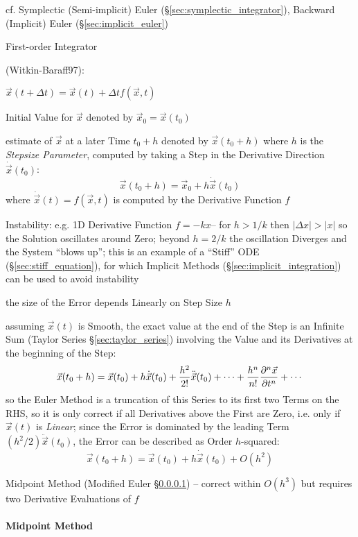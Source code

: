 \fist cf. Symplectic (Semi-implicit) Euler (\S\ref{sec:symplectic_integrator}),
Backward (Implicit) Euler (\S\ref{sec:implicit_euler})

First-order Integrator

(Witkin-Baraff97):

$\vec{x}(t + \Delta{t}) = \vec{x}(t) + \Delta{t}f(\vec{x},t)$

Initial Value for $\vec{x}$ denoted by $\vec{x}_0 = \vec{x}(t_0)$

estimate of $\vec{x}$ at a later Time $t_0 + h$ denoted by $\vec{x}(t_0 + h)$
where $h$ is the \emph{Stepsize Parameter}, computed by taking a Step in the
Derivative Direction $\dot{\vec{x}}(t_0)$:
\[
  \vec{x}(t_0 + h) = \vec{x}_0 + h\dot{\vec{x}}(t_0)
\]
where $\dot{\vec{x}}(t) = f(\vec{x}, t)$ is computed by the Derivative Function
$f$

Instability: e.g. 1D Derivative Function $f = -kx$-- for $h > 1/k$ then
$|\Delta{x}| > |x|$ so the Solution oscillates around Zero; beyond $h = 2/k$ the
oscillation Diverges and the System ``blows up''; this is an example of a
``Stiff'' ODE (\S\ref{sec:stiff_equation}), for which Implicit Methods
(\S\ref{sec:implicit_integration}) can be used to avoid instability

the size of the Error depends Linearly on Step Size $h$

assuming $\vec{x}(t)$ is Smooth, the exact value at the end of the Step is an
Infinite Sum (Taylor Series \S\ref{sec:taylor_series}) involving the Value and
its Derivatives at the beginning of the Step:
\[
  \vec{x}(t_0 + h) = \vec{x}(t_0) + h\dot{\vec{x}}(t_0) +
    \frac{h^2}{2!}\ddot{\vec{x}}(t_0) + \cdots +
    \frac{h^n}{n!}\frac{\partial{^n\vec{x}}}{\partial{t^n}} + \cdots
\]
so the Euler Method is a truncation of this Series to its first two Terms on the
RHS, so it is only correct if all Derivatives above the First are Zero, i.e.
only if $\vec{x}(t)$ is \emph{Linear}; since the Error is dominated by the
leading Term $(h^2/2)\ddot{\vec{x}}(t_0)$, the Error can be described as Order
$h$-squared:
\[
  \vec{x}(t_0 + h) = \vec{x}(t_0) + h\dot{\vec{x}}(t_0) + O(h^2)
\]

Midpoint Method (Modified Euler \S\ref{sec:midpoint_method}) -- correct within
$O(h^3)$ but requires two Derivative Evaluations of $f$



\paragraph{Midpoint Method}\label{sec:midpoint_method}\hfill

